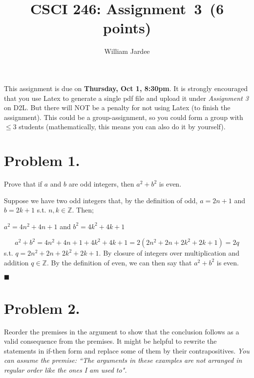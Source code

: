 \documentclass[11pt]{article}
\begin{document}
\date{}

\title{CSCI 246: Assignment~3~(6 points)}

\author{William Jardee}

\maketitle


\noindent
This assignment is due on {\bf Thursday, Oct 1, 8:30pm}. It is strongly
encouraged that you use Latex to generate a single pdf file and upload it
under {\em Assignment 3} on D2L. But there will NOT be a penalty for not
using Latex (to finish the assignment). This could be a group-assignment,
so you could form a group with $\leq 3$ students (mathematically, this means
you can also do it by yourself).
\newline
 
\section*{Problem 1.}

\noindent
Prove that if $a$ and $b$ are odd integers, then $a^2+b^2$ is even.
\newline

Suppose we have two odd integers that, by the definition of odd, $a=2n+1$ and $b = 2k+1$ s.t. $n,k \in \mathbb{Z}$. Then;
\begin{center}  $a^2 = 4n^2 +  4n + 1$ and $b^2 = 4k^2 + 4k + 1$\end{center}
\[a^2 + b^2 = 4n^2 +4n +1 + 4k^2 + 4k +1 = 2(2n^2 +2n +2k^2 +2k +1) = 2q\]
s.t. $q = 2n^2 +2n +2k^2 +2k +1$. By closure of integers over multiplication and addition $q \in \mathbb{Z}$. By the definition of even, we can then say that $a^2 + b^2$ is even. 
\begin{flushright}$\blacksquare$\end{flushright}

\newpage


\section*{Problem 2.}

\noindent
Reorder the premises in the argument to show that the conclusion follows as
a valid consequence from the premises. It might be helpful to rewrite the
statements in if-then form and replace some of them by their contrapositives.
{\em You can assume the premise: ``The arguments in these examples are not arranged in regular order like the ones I am used to".}
\newline
\end{document}
